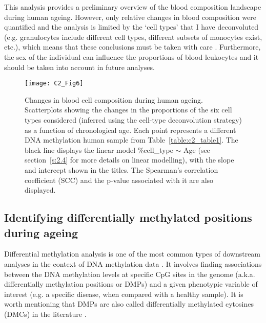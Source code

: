 \bigskip

This analysis provides a preliminary overview of the blood composition landscape during human ageing. However, only relative changes in blood composition were quantified and the analysis is limited by the `cell types' that I have deconvoluted (e.g. granulocytes include different cell types, different subsets of monocytes exist, etc.), which means that these conclusions must be taken with care \cite{Nikolich-Zugich2018}. Furthermore, the sex of the individual can influence the proportions of blood leukocytes \cite{Chen2016a} and it should be taken into account in future analyses. 

\begin{figure}[htbp!] 
	\centering    
	\texttt{[image: C2\_Fig6]}
	\caption[Changes in blood cell composition during human ageing]{Changes in blood cell composition during human ageing. Scatterplots showing the changes in the proportions of the six cell types considered (inferred using the cell-type deconvolution strategy) as a function of chronological age. Each point represents a different DNA methylation human sample from Table~\ref{table:c2_table1}. The black line displays the linear model \%cell\_type $\sim$ Age (see section~\ref{s:2.4} for more details on linear modelling), with the slope and intercept shown in the titles. The Spearman's correlation coefficient (\acrshort{SCC}) and the p-value associated with it are also displayed.}
	\label{fig:c2_fig6}
\end{figure}



\smallskip

\subsection{Identifying differentially methylated positions during ageing} \label{s:2.1.4}

\smallskip

Differential methylation analysis is one of the most common types of downstream analyses in the context of DNA methylation data \cite{Wilhelm-Benartzi2013,Morris2015,Teschendorff2018}. It involves finding associations between the DNA methylation levels at specific CpG sites in the genome (a.k.a. differentially methylation positions or \acrshort{DMPs}) and a given phenotypic variable of interest (e.g. a specific disease, when compared with a healthy sample). It is worth mentioning that DMPs are also called differentially methylated cytosines (\acrshort{DMCs}) in the literature \cite{Teschendorff2018}.

